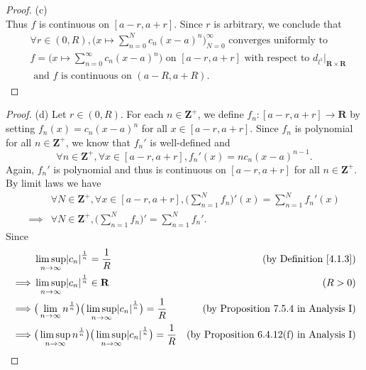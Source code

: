 \begin{proof}{(c)}
\[    \]
    Thus \(f\) is continuous on \([a - r, a + r]\).
    Since \(r\) is arbitrary, we conclude that
    \begin{align*}
         & \forall r \in (0, R), \bigg(x \mapsto \sum_{n = 0}^N c_n (x - a)^n\bigg)_{N = 0}^\infty \text{ converges uniformly to }                                 \\
         & f = \bigg(x \mapsto \sum_{n = 0}^\infty c_n (x - a)^n\bigg) \text{ on } [a - r, a + r] \text{ with respect to } d_{l^1}|_{\mathbf{R} \times \mathbf{R}} \\
         & \text{ and } f \text{ is continuous on } (a - R, a + R).
    \end{align*}
\end{proof}

\begin{proof}{(d)}
    Let \(r \in (0, R)\).
    For each \(n \in \mathbf{Z}^+\), we define \(f_n : [a - r, a + r] \to \mathbf{R}\) by setting \(f_n(x) = c_n (x - a)^n\) for all \(x \in [a - r, a + r]\).
    Since \(f_n\) is polynomial for all \(n \in \mathbf{Z}^+\), we know that \(f_n'\) is well-defined and
    \[
        \forall n \in \mathbf{Z}^+, \forall x \in [a - r, a + r], f_n'(x) = n c_n (x - a)^{n - 1}.
    \]
    Again, \(f_n'\) is polynomial and thus is continuous on \([a - r, a + r]\) for all \(n \in \mathbf{Z}^+\).
    By limit laws we have
    \begin{align*}
                 & \forall N \in \mathbf{Z}^+, \forall x \in [a - r, a + r], \bigg(\sum_{n = 1}^N f_n\bigg)'(x) = \sum_{n = 1}^N f_n'(x) \\
        \implies & \forall N \in \mathbf{Z}^+, \bigg(\sum_{n = 1}^N f_n\bigg)' = \sum_{n = 1}^N f_n'.
    \end{align*}
    Since
    \begin{align*}
                 & \limsup_{n \to \infty} \abs*{c_n}^{\frac{1}{n}} = \frac{1}{R}                                                            & \text{(by Definition \ref{4.1.3})}              \\
        \implies & \limsup_{n \to \infty} \abs*{c_n}^{\frac{1}{n}} \in \mathbf{R}                                                           & (R > 0)                                         \\
        \implies & \big(\lim_{n \to \infty} n^{\frac{1}{n}}\big) \big(\limsup_{n \to \infty} \abs*{c_n}^{\frac{1}{n}}\big) = \frac{1}{R}    & \text{(by Proposition 7.5.4 in Analysis I)}     \\
        \implies & \big(\limsup_{n \to \infty} n^{\frac{1}{n}}\big) \big(\limsup_{n \to \infty} \abs*{c_n}^{\frac{1}{n}}\big) = \frac{1}{R} & \text{(by Proposition 6.4.12(f) in Analysis I)} \\

\end{align*}
\end{proof}
